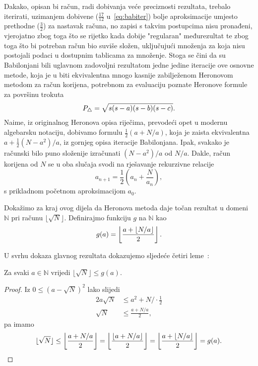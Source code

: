 \documentclass[12pt]{scrartcl}
\begin{document}
Dakako, opisan bi račun, radi dobivanja veće preciznosti rezultata, trebalo iterirati,
uzimanjem dobivene ($\frac{17}{12}$ u~\eqref{eq:babiter}) bolje aproksimacije umjesto prethodne
($\frac32$) za nastavak računa, no zapisi s takvim postupcima nisu pronađeni,
vjerojatno zbog toga što se rijetko kada dobije "regularan" međurezultat te zbog toga što
bi potreban račun bio suviše složen, uključujući množenja za koja nisu postojali podaci u dostupnim tablicama za množenje. Stoga se čini da su 
Babilonjani bili uglavnom zadovoljni rezultatom jedne jedine iteracije ove osnovne metode, koja je u biti ekvivalentna mnogo kasnije zabilježenom Heronovom
metodom za račun korijena, potrebnom za evaluaciju poznate Heronove formule za površinu trokuta
\begin{equation*}
    P_{\triangle} = \sqrt{s(s-a)(s-b)(s-c)}\text.
\end{equation*}
Naime, iz originalnog Heronova opisa riječima, prevodeći opet u modernu algebarsku notaciju, dobivamo formulu $\frac12(a+N/a)$, koja je
zaista ekvivalentna $a+\frac12(N-a^2)/a$, iz gornjeg opisa iteracije Babilonjana. Ipak, svakako je računski bilo puno složenije izračunati
$(N-a^2)/a$ od $N/a$.
Dakle, račun korijena od $N$ se u oba slučaja svodi na rješavanje rekurzivne relacije
\begin{equation}
    a_{n+1}=\frac12\left(a_n+\frac{N}{a_n}\right),
\end{equation}
s prikladnom početnom aproksimacijom $a_0$.

Dokažimo za kraj ovog dijela da Heronova metoda daje točan rezultat u domeni $\mathbb N$ pri računu $\lfloor\sqrt{N}\rfloor$.
 Definirajmo funkciju $g$ na $\mathbb N$ kao
\begin{equation}
    g(a) = \left\lfloor\frac{a+\lfloor N/a\rfloor}{2}\right\rfloor\text.
\end{equation}

U svrhu dokaza glavnog rezultata dokazujemo sljedeće četiri leme~\cite{mdickpaper}:
\begin{lema}\label{lm:heron1}
    Za svaki $a\in\mathbb N$ vrijedi $\lfloor\sqrt{N}\rfloor \leq g(a)$.
\end{lema}
\begin{proof}
    Iz $0\leq(a-\sqrt{N})^2$ lako slijedi
    \begin{align*}
        2a\sqrt{N} &\leq a^2 + N\Bigr/\cdot\frac12 \\
        \sqrt{N}&\leq\frac{a+N/a}{2},
    \end{align*}
pa imamo 
\begin{equation*}
    \lfloor\sqrt{N}\rfloor\leq\left\lfloor\frac{a+N/a}{2}\right\rfloor=\left\lfloor\frac{\lfloor a+N/a\rfloor}{2}\right\rfloor
    =\left\lfloor\frac{a+\lfloor N/a\rfloor}{2}\right\rfloor=g(a)\text.
\end{equation*}
\end{proof}
\end{document}

